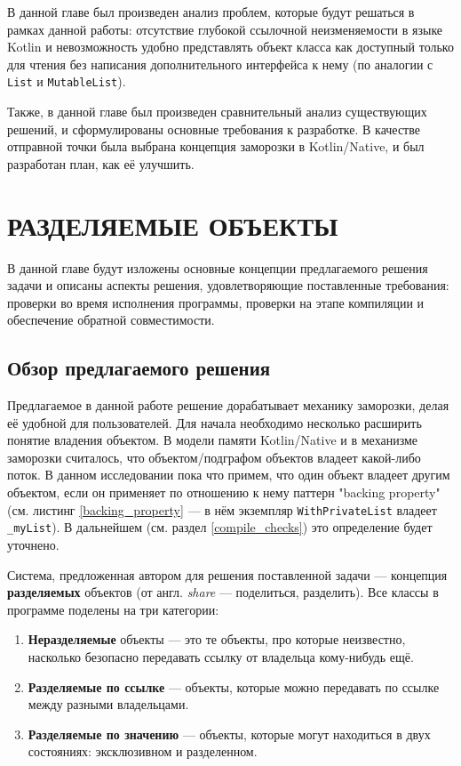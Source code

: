\documentclass[specification,annotation,times]{itmo-student-thesis}
\begin{document}
\finishrelatedwork

\chapterconclusion

В данной главе был произведен анализ проблем, которые будут решаться в рамках данной работы: отсутствие глубокой ссылочной неизменяемости в языке Kotlin и невозможность удобно представлять объект класса как доступный только для чтения без написания дополнительного интерфейса к нему (по аналогии с \texttt{List} и \texttt{MutableList}).

Также, в данной главе был произведен сравнительный анализ существующих решений, и сформулированы основные требования к разработке.
В качестве отправной точки была выбрана концепция заморозки в Kotlin/Native, и был разработан план, как её улучшить.



\chapter{РАЗДЕЛЯЕМЫЕ ОБЪЕКТЫ}

В данной главе будут изложены основные концепции предлагаемого решения задачи и описаны аспекты решения, удовлетворяющие поставленные требования: проверки во время исполнения программы, проверки на этапе компиляции и обеспечение обратной совместимости.

\section{Обзор предлагаемого решения}\label{overview}

Предлагаемое в данной работе решение дорабатывает механику заморозки, делая её удобной для пользователей.
Для начала необходимо несколько расширить понятие владения объектом.
В модели памяти Kotlin/Native и в механизме заморозки считалось, что объектом/подграфом объектов владеет какой-либо поток.
В данном исследовании пока что примем, что один объект владеет другим объектом, если он применяет по отношению к нему паттерн "backing property" (см. листинг \ref{backing_property} --- в нём экземпляр \texttt{WithPrivateList} владеет \texttt{\_myList}). В дальнейшем (см. раздел \ref{compile_checks}) это определение будет уточнено.

Система, предложенная автором для решения поставленной задачи --- концепция \textbf{разделяемых} объектов (от англ. \textit{share} --- поделиться, разделить).
Все классы в программе поделены на три категории:
\begin{enumerate}
	\item \textbf{Неразделяемые} объекты --- это те объекты, про которые неизвестно, насколько безопасно передавать ссылку от владельца кому-нибудь ещё.
	\item \textbf{Разделяемые по ссылке} --- объекты, которые можно передавать по ссылке между разными владельцами.
	\item \textbf{Разделяемые по значению} --- объекты, которые могут находиться в двух состояниях: эксклюзивном и разделенном.
\end{enumerate}
\end{document}
